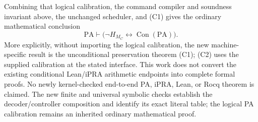 Combining that logical calibration, the command compiler and soundness
invariant above, the unchanged scheduler, and (C1) gives the ordinary
mathematical conclusion
\[
       \mathrm{PA}\vdash
       \bigl(\neg H_{M_C}\leftrightarrow\operatorname{Con}(\mathrm{PA})\bigr).
\tag{C2}
\]
More explicitly, without importing the logical calibration, the new
machine-specific result is the unconditional preservation theorem (C1);
(C2) uses the supplied calibration at the stated interface. This work does
not convert the existing conditional Lean/iPRA arithmetic endpoints into
complete formal proofs. No newly kernel-checked end-to-end PA, iPRA, Lean,
or Rocq theorem is claimed. The new finite and universal symbolic checks
establish the decoder/controller composition and identify its exact
literal table; the logical PA calibration remains an inherited ordinary
mathematical proof.
